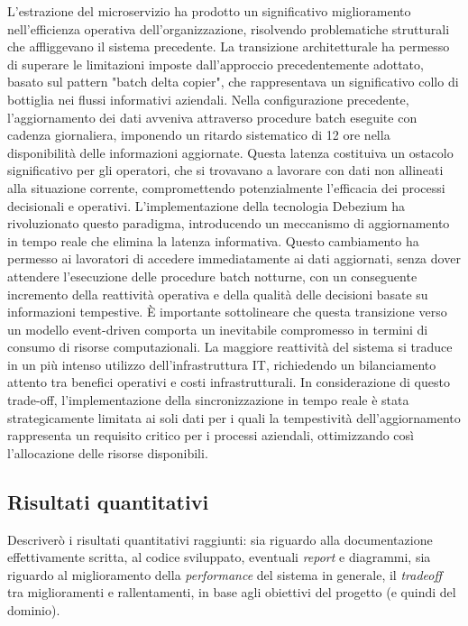         L'estrazione del microservizio ha prodotto un significativo miglioramento nell'efficienza operativa dell'organizzazione, risolvendo problematiche strutturali che affliggevano il sistema precedente. La transizione architetturale ha permesso di superare le limitazioni imposte dall'approccio precedentemente adottato, basato sul pattern "batch delta copier", che rappresentava un significativo collo di bottiglia nei flussi informativi aziendali.
Nella configurazione precedente, l'aggiornamento dei dati avveniva attraverso procedure batch eseguite con cadenza giornaliera, imponendo un ritardo sistematico di 12 ore nella disponibilità delle informazioni aggiornate. Questa latenza costituiva un ostacolo significativo per gli operatori, che si trovavano a lavorare con dati non allineati alla situazione corrente, compromettendo potenzialmente l'efficacia dei processi decisionali e operativi.
L'implementazione della tecnologia Debezium ha rivoluzionato questo paradigma, introducendo un meccanismo di aggiornamento in tempo reale che elimina la latenza informativa. Questo cambiamento ha permesso ai lavoratori di accedere immediatamente ai dati aggiornati, senza dover attendere l'esecuzione delle procedure batch notturne, con un conseguente incremento della reattività operativa e della qualità delle decisioni basate su informazioni tempestive.
È importante sottolineare che questa transizione verso un modello event-driven comporta un inevitabile compromesso in termini di consumo di risorse computazionali. La maggiore reattività del sistema si traduce in un più intenso utilizzo dell'infrastruttura IT, richiedendo un bilanciamento attento tra benefici operativi e costi infrastrutturali. In considerazione di questo trade-off, l'implementazione della sincronizzazione in tempo reale è stata strategicamente limitata ai soli dati per i quali la tempestività dell'aggiornamento rappresenta un requisito critico per i processi aziendali, ottimizzando così l'allocazione delle risorse disponibili.

        
        \subsection{Risultati quantitativi}
        Descriverò i risultati quantitativi raggiunti: sia riguardo alla documentazione effettivamente scritta, al codice sviluppato, eventuali \textit{report} e diagrammi, sia riguardo al miglioramento della \textit{performance} del sistema in generale, il \textit{tradeoff} tra miglioramenti e rallentamenti, in base agli obiettivi del progetto (e quindi del dominio).

